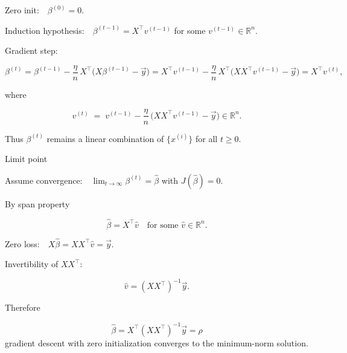
\begin{answer}
Zero init: $\beta^{(0)}=0.$

Induction hypothesis: $\beta^{(t-1)} = X^{\top} v^{(t-1)}$ for some $v^{(t-1)}\in\mathbb{R}^{n}$.

Gradient step:

$$
\beta^{(t)}=\beta^{(t-1)}-\frac{\eta}{n}\,X^{\top}\!\bigl(X\beta^{(t-1)}-\vec y\bigr)
          =X^{\top}v^{(t-1)}-\frac{\eta}{n}\,X^{\top}\!\bigl(X X^{\top}v^{(t-1)}-\vec y\bigr)
          =X^{\top}v^{(t)}, 
$$

where

$$
v^{(t)} \;=\; v^{(t-1)}-\frac{\eta}{n}\,\bigl(X X^{\top}v^{(t-1)}-\vec y\bigr)\in\mathbb{R}^{n}.
$$

Thus $\beta^{(t)}$ remains a linear combination of $\{x^{(i)}\}$ for all $t\ge0$.



Limit point

Assume convergence: $\displaystyle\lim_{t\to\infty}\beta^{(t)}=\hat\beta$ with $J(\hat\beta)=0$.

By span property

$$
\hat\beta = X^{\top}\hat v\quad\text{for some }\hat v\in\mathbb{R}^{n}.
$$

Zero loss: $X\hat\beta = X X^{\top}\hat v = \vec y.$

Invertibility of $X X^{\top}$:

$$
\hat v = (X X^{\top})^{-1}\vec y.
$$

Therefore

$$
\boxed{\hat\beta = X^{\top}(X X^{\top})^{-1}\vec y = \rho}
$$
 gradient descent with zero initialization converges to the minimum-norm solution.
\end{answer}